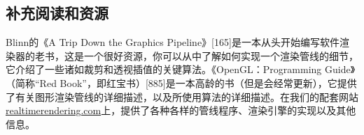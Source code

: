 \documentclass[
  paper=a4,
  ,captions=tableheading
]{scrartcl}
\begin{document}
\subsection{补充阅读和资源}\label{ux8865ux5145ux9605ux8bfbux548cux8d44ux6e90}

Blinn的《A Trip Down the Graphics
Pipeline》{[}165{]}是一本从头开始编写软件渲染器的老书，这是一个很好资源，你可以从中了解如何实现一个渲染管线的细节，它介绍了一些诸如裁剪和透视插值的关键算法。《OpenGL：Programming
Guide》（简称``Red
Book''，即红宝书）{[}885{]}是一本高龄的书（但是会经常更新），它提供了有关图形渲染管线的详细描述，以及所使用算法的详细描述。在我们的配套网站\href{http://realtimerendering.com}{realtimerendering.com}上，提供了各种各样的管线程序、渲染引擎的实现以及其他信息。
\end{document}
